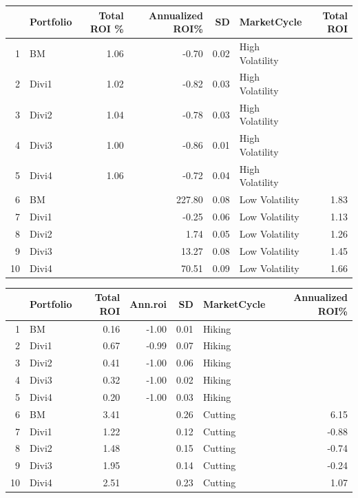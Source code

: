 \documentclass[12pt,preprint, authoryear]{elsarticle}
\let\origtable\table
\let\endorigtable\endtable
\renewenvironment{table}[1][2] {
    \expandafter\origtable\expandafter[H]
} {
    \endorigtable
}
\numberwithin{equation}{section}
\numberwithin{figure}{section}
\numberwithin{table}{section}
\begin{document}
\begin{table}[H]
\centering
\begin{tabular}{rlrrrlr}
  \hline
 & Portfolio & Total ROI \% & Annualized ROI\% & SD & MarketCycle & Total ROI \\ 
  \hline
1 & BM & 1.06 & -0.70 & 0.02 & High Volatility  &  \\ 
  2 & Divi1 & 1.02 & -0.82 & 0.03 & High Volatility  &  \\ 
  3 & Divi2 & 1.04 & -0.78 & 0.03 & High Volatility  &  \\ 
  4 & Divi3 & 1.00 & -0.86 & 0.01 & High Volatility  &  \\ 
  5 & Divi4 & 1.06 & -0.72 & 0.04 & High Volatility  &  \\ 
  6 & BM &  & 227.80 & 0.08 & Low Volatility  & 1.83 \\ 
  7 & Divi1 &  & -0.25 & 0.06 & Low Volatility  & 1.13 \\ 
  8 & Divi2 &  & 1.74 & 0.05 & Low Volatility  & 1.26 \\ 
  9 & Divi3 &  & 13.27 & 0.08 & Low Volatility  & 1.45 \\ 
  10 & Divi4 &  & 70.51 & 0.09 & Low Volatility  & 1.66 \\ 
   \hline
\end{tabular}
\caption{Market Cycle Perforomance \label{tab3}} 
\end{table}

\begin{table}[H]
\centering
\begin{tabular}{rlrrrlr}
  \hline
 & Portfolio & Total ROI & Ann.roi & SD & MarketCycle & Annualized ROI\% \\ 
  \hline
1 & BM & 0.16 & -1.00 & 0.01 & Hiking  &  \\ 
  2 & Divi1 & 0.67 & -0.99 & 0.07 & Hiking  &  \\ 
  3 & Divi2 & 0.41 & -1.00 & 0.06 & Hiking  &  \\ 
  4 & Divi3 & 0.32 & -1.00 & 0.02 & Hiking  &  \\ 
  5 & Divi4 & 0.20 & -1.00 & 0.03 & Hiking  &  \\ 
  6 & BM & 3.41 &  & 0.26 & Cutting & 6.15 \\ 
  7 & Divi1 & 1.22 &  & 0.12 & Cutting & -0.88 \\ 
  8 & Divi2 & 1.48 &  & 0.15 & Cutting & -0.74 \\ 
  9 & Divi3 & 1.95 &  & 0.14 & Cutting & -0.24 \\ 
  10 & Divi4 & 2.51 &  & 0.23 & Cutting & 1.07 \\ 
   \hline
\end{tabular}
\caption{Interest Rate Regime Performance \label{tab4}} 
\end{table}
\newpage
\end{document}
